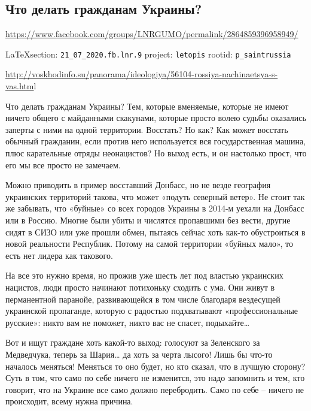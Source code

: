  
 
\subsection{Что делать гражданам Украины?}
\url{https://www.facebook.com/groups/LNRGUMO/permalink/2864859396958949/}
  
\vspace{0.5cm}
{\small\LaTeX section: \verb|21_07_2020.fb.lnr.9| project: \verb|letopis| rootid: \verb|p_saintrussia|}
\vspace{0.5cm}

\url{http://voskhodinfo.su/panorama/ideologiya/56104-rossiya-nachinaetsya-s-vas.htm}l

Что делать гражданам Украины? Тем, которые вменяемые, которые не имеют ничего общего с майданными скакунами, которые просто волею судьбы оказались заперты с ними на одной территории. Восстать? Но как? Как может восстать обычный гражданин, если против него используется вся государственная машина, плюс карательные отряды неонацистов? Но выход есть, и он настолько прост, что его мы все просто не замечаем.

Можно приводить в пример восставший Донбасс, но не везде география украинских территорий такова, что может «подуть северный ветер». Не стоит так же забывать, что «буйные» со всех городов Украины в 2014-м уехали на Донбасс или в Россию. Многие были убиты и числятся пропавшими без вести, другие сидят в СИЗО или уже прошли обмен, пытаясь сейчас хоть как-то обустроиться в новой реальности Республик. Потому на самой территории «буйных мало», то есть нет лидера как такового.

На все это нужно время, но прожив уже шесть лет под властью украинских нацистов, люди просто начинают потихоньку сходить с ума. Они живут в перманентной паранойе, развивающейся в том числе благодаря вездесущей украинской пропаганде, которую с радостью подхватывают «профессиональные русские»: никто вам не поможет, никто вас не спасет, подыхайте…

Вот и ищут граждане хоть какой-то выход: голосуют за Зеленского за Медведчука, теперь за Шария… да хоть за черта лысого! Лишь бы что-то началось меняться! Меняться то оно будет, но кто сказал, что в лучшую сторону? Суть в том, что само по себе ничего не изменится, это надо запомнить и тем, кто говорит, что на Украине все само должно перебродить. Само по себе – ничего не происходит, всему нужна причина.

